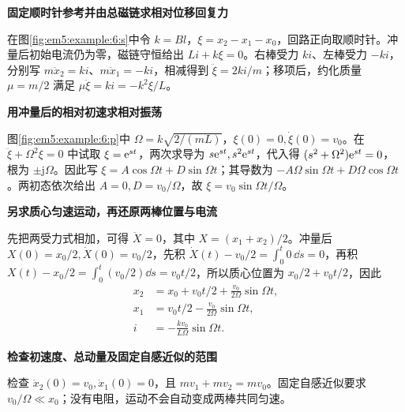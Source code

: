 \begin{solution}\textbf{固定顺时针参考并由总磁链求相对位移回复力}\par\nobreak
在图\ref{fig:em5:example:6:s}中令 $k=Bl$，$\xi=x_2-x_1-x_0$，回路正向取顺时针。冲量后初始电流仍为零，磁链守恒给出 $Li+k\xi=0$。右棒受力 $ki$、左棒受力 $-ki$，分别写 $m\ddot x_2=ki$、$m\ddot x_1=-ki$，相减得到 $\ddot\xi=2ki/m$；移项后，约化质量 $\mu=m/2$ 满足 $\mu\ddot\xi=ki=-k^2\xi/L$。



\par\medskip{}\noindent\textbf{用冲量后的相对初速求相对振荡}\par\nobreak
图\ref{fig:em5:example:6:p}中 $\Omega=k\sqrt{2/(mL)}$，$\xi(0)=0,\dot\xi(0)=v_0$。在 $\ddot\xi+\Omega^2\xi=0$ 中试取 $\xi=\mathrm e^{st}$，两次求导为 $s\mathrm e^{st},s^2\mathrm e^{st}$，代入得 $(s^2+\Omega^2)\mathrm e^{st}=0$，根为 $\pm\mathrm j\Omega$。因此写 $\xi=A\cos\Omega t+D\sin\Omega t$；其导数为 $-A\Omega\sin\Omega t+D\Omega\cos\Omega t$。两初态依次给出 $A=0,D=v_0/\Omega$，故 $\xi=v_0\sin\Omega t/\Omega$。

\par\medskip{}\noindent\textbf{另求质心匀速运动，再还原两棒位置与电流}\par\nobreak
先把两受力式相加，可得 $\ddot X=0$，其中 $X=(x_1+x_2)/2$。冲量后 $X(0)=x_0/2,\dot X(0)=v_0/2$，先积 $\dot X(t)-v_0/2=\int_0^t0\,\dd s=0$，再积 $X(t)-x_0/2=\int_0^t(v_0/2)\dd s=v_0t/2$，所以质心位置为 $x_0/2+v_0t/2$，因此
\begin{align*}x_2&=x_0+v_0t/2+\frac{v_0}{2\Omega}\sin\Omega t,\\x_1&=v_0t/2-\frac{v_0}{2\Omega}\sin\Omega t,\\i&=-\frac{kv_0}{L\Omega}\sin\Omega t.\end{align*}


\par\medskip{}\noindent\textbf{检查初速度、总动量及固定自感近似的范围}\par\nobreak
检查 $\dot x_2(0)=v_0,\dot x_1(0)=0$，且 $mv_1+mv_2=mv_0$。固定自感近似要求 $v_0/\Omega\ll x_0$；没有电阻，运动不会自动变成两棒共同匀速。\end{solution}
